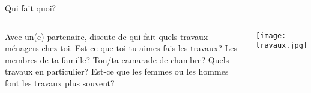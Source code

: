 \begin{frame}{Qui fait quoi?}
  \begin{columns}
      Avec un(e) partenaire, discute de qui fait quels travaux ménagers chez toi.
      Est-ce que toi tu aimes fais les travaux?
      Les membres de ta famille?
      Ton/ta camarade de chambre?
      Quels travaux en particulier?
      Est-ce que les femmes ou les hommes font les travaux plus souvent?
      \begin{center}
        \texttt{[image: travaux.jpg]}
      \end{center}
  \end{columns}
\end{frame}